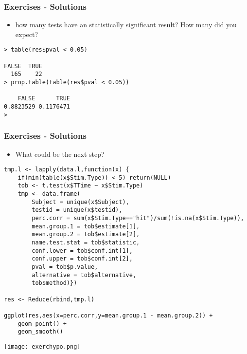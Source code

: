 \begin{frame}[fragile]\frametitle{Exercises - Solutions}
  \begin{itemize}
  \item how many tests have an statistically significant result? How many did you expect? 
  \end{itemize}\footnotesize
\begin{verbatim}
> table(res$pval < 0.05)

FALSE  TRUE 
  165    22 
> prop.table(table(res$pval < 0.05))

    FALSE      TRUE 
0.8823529 0.1176471 
> 
\end{verbatim}
\end{frame}


\begin{frame}\frametitle{Exercises - Solutions}
  \begin{itemize}
  \item  What could be the next step?
  \end{itemize}\tiny
\begin{verbatim}
tmp.l <- lapply(data.l,function(x) {
    if(min(table(x$Stim.Type)) < 5) return(NULL)
    tob <- t.test(x$TTime ~ x$Stim.Type)
    tmp <- data.frame(
        Subject = unique(x$Subject),
        testid = unique(x$testid),
        perc.corr = sum(x$Stim.Type=="hit")/sum(!is.na(x$Stim.Type)),
        mean.group.1 = tob$estimate[1],
        mean.group.2 = tob$estimate[2],
        name.test.stat = tob$statistic,
        conf.lower = tob$conf.int[1],
        conf.upper = tob$conf.int[2],
        pval = tob$p.value,
        alternative = tob$alternative,
        tob$method)})

res <- Reduce(rbind,tmp.l)

ggplot(res,aes(x=perc.corr,y=mean.group.1 - mean.group.2)) +
    geom_point() +
    geom_smooth()
\end{verbatim}
\begin{center}
  \texttt{[image: exerchypo.png]}
\end{center}  
\end{frame}


